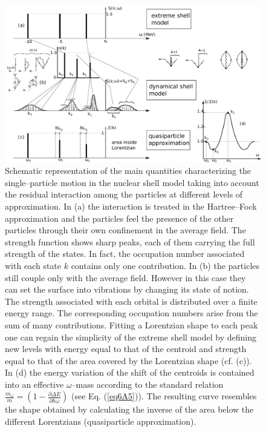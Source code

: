 \begin{subappendices}
        \begin{figure}
        \centerline{\includegraphics*[width=15cm,angle=0]{C6/figs_C6/fig4I1.pdf}}
        	\caption{Schematic representation of the main quantities characterizing the single--particle motion in the nuclear shell model taking into account the residual interaction among the particles at different levels of approximation.
        	In (a) the interaction is treated in the Hartree--Fock approximation and the particles feel the presence of the other particles through their own confinement in the average field. The strength function shows sharp peaks, each of them carrying the full strength of the states. In fact, the occupation number associated with each state $k$ contains only one contribution. In (b) the particles still couple   only  with the average field. However in this case they can set the surface into vibrations by changing its state of notion. The strength associated with each orbital is distributed over a finite energy range. The corresponding occupation numbers arise from the sum of many contributions. Fitting a Lorentzian shape to each peak one can regain the simplicity of the extreme shell model by defining new levels with energy equal to that of the centroid and strength equal to that of the area covered by the Lorentzian shape (cf. (c)). In (d) the energy variation of the shift of the centroids is contained into an effective $\omega$--mass according to the standard relation $\frac{m_\omega}{m}=\left(1-\frac{\partial \Delta E}{\partial \hbar \omega}\right)$ (see Eq. (\ref{eq6A5})). The resulting curve resembles the shape obtained by calculating the inverse of the area below the different Lorentzians (quasiparticle approximation).}\label{fig8.F.1}
        \end{figure}



\end{subappendices}
